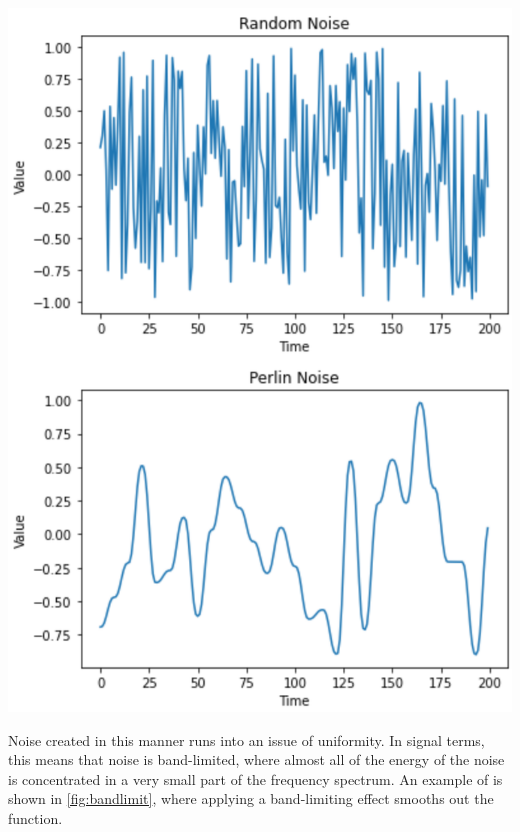 \documentclass[10pt]{report}
\begin{document}
		\begin{minipage}{\textwidth}
			\centering
			\includegraphics[scale=0.3]{perlinnoise}
			\label{fig:perlinnoise}
		\end{minipage}
	
		Noise created in this manner runs into an issue of uniformity. In signal terms, this means that noise is band-limited, where almost all of the energy of the noise is concentrated in a very small part of the frequency spectrum. An example of is shown in \autoref{fig:bandlimit}, where applying a band-limiting effect smooths out the function.
		
\end{document}
